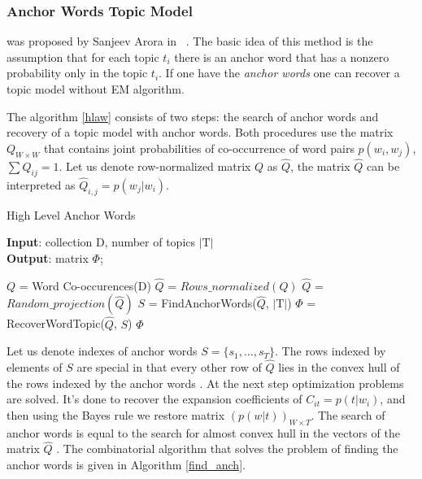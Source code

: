 \documentclass[runningheads,a4paper]{llncs}
\begin{document}
	\subsubsection{Anchor Words Topic Model}  was proposed by Sanjeev Arora in ~\cite{arora2012learning,arora2012practical}.  The basic idea of this method is the assumption that for each topic $t_i$ there is an anchor word that has a nonzero probability only in the topic $t_i$. If one have the \emph{anchor words}  one can recover a topic model without EM algorithm.

	The algorithm \ref{hlaw} consists of two steps: the search of anchor words and recovery of a topic model with anchor words. Both procedures use the matrix $Q_{W \times W}$ that contains joint probabilities of co-occurrence of word pairs $p(w_i, w_j)$, $\sum Q_{ij} = 1$. Let us denote row-normalized matrix $Q$ as $\hat{Q}$, the matrix $\hat{Q}$ can be interpreted as $\hat{Q}_{i, j} = p (w_j | w_i)$. 
	
	\begin{singlespacing}
		\begin{algorithm}
			\caption{High Level Anchor Words}
			\label{hlaw}
			\textbf{Input}: collection $\textrm{D}$, number of topics $|\textrm{T}|$\\
			\textbf{Output}: matrix $\Phi$; 
			\begin{algorithmic}[1]
				\State $Q$ = Word Co-occurences($\textrm{D}$)
				\State $\hat{Q}$ = $Rows\_normalized(Q)$
				\State $\hat{Q}$ = $Random\_projection(\hat{Q})$
				\State $S$ = FindAnchorWords($\hat{Q}$, $|\textrm{T}|$)
				\State $\Phi$ = RecoverWordTopic($\hat{Q}$, $S$)
				\State \Return $\Phi$
			\end{algorithmic}
		\end{algorithm}
	\end{singlespacing} 
	
	Let us denote indexes of anchor words $S = \{s_1, \dots ,s_T\}$. The rows indexed by elements of $S$ are special in that every other row of $\hat{Q}$ lies in the convex hull of the rows indexed by the anchor words \cite{arora2012practical}. At the next step optimization problems are solved. It's done to recover the expansion coefficients of $C_{it} = p(t|w_i)$, and then using the Bayes rule we restore matrix $(p(w|t))_{W \times T} $. The search of anchor words is equal to the search for almost convex hull in the vectors of the matrix $\hat{Q}$ \cite {arora2012practical}. The combinatorial algorithm that solves the problem of finding the anchor words is given in Algorithm \ref{find_anch}.
	
\end{document}
